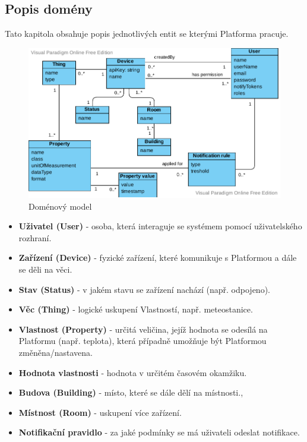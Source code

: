 \subsection{Popis domény} %
Tato kapitola obsahuje popis jednotlivých entit se kterými Platforma pracuje.
\begin{figure}[htbp]
    \centering
    \includegraphics[width=\textwidth]{img/domain.pdf}
    \caption{  \label{domain-model}Doménový model}
\end{figure}
\begin{itemize}
    \item \textbf{Uživatel (User)} - osoba, která interaguje se systémem pomocí uživatelského rozhraní.
    \item \textbf{Zařízení (Device)} - fyzické zařízení, které komunikuje s Platformou a dále se děli na věci.
    \item \textbf{Stav (Status)} - v jakém stavu se zařízení nachází (např. odpojeno).
    \item \textbf{Věc (Thing)} - logické uskupení Vlastností, např. meteostanice.
    \item \textbf{Vlastnost (Property)} - určitá veličina, jejíž hodnota se odesílá na Platformu (např. teplota), která případně umožňuje být Platformou změněna/nastavena.
    \item \textbf{Hodnota vlastnosti} - hodnota v určitém časovém okamžiku.
    \item \textbf{Budova (Building)} - místo, které se dále dělí na místnosti.,
    \item \textbf{Místnost (Room)} - uskupení více zařízení.
    \item \textbf{Notifikační pravidlo} - za jaké podmínky se má uživateli odeslat notifikace.
\end{itemize}


